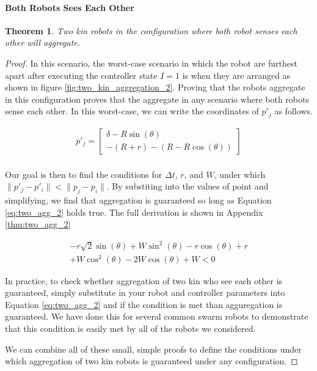 \documentclass[conference]{IEEEtran}
\newtheorem{theorem}{Theorem}
\begin{document}
    \paragraph{Both Robots Sees Each Other}
    \begin{theorem}
      Two kin robots in the configuration where both robot senses each other will aggregate.
    \end{theorem}
    \begin{proof}
      In this scenario, the worst-case scenario in which the robot are furthest apart after executing the controller state $I=1$ is when they are arranged as shown in figure \ref{fig:two_kin_aggregation_2}. Proving that the robots aggregate in this configuration proves that the aggregate in any scenario where both robots sense each other. In this worst-case, we can write the coordinates of $p'_j$ as follows.

    \begin{equation} \label{eq:two_kin_vars_1}
      \begin{split}
        p'_j = \begin{bmatrix}\delta - R\sin(\theta) \\ -(R+r) - (R-R\cos(\theta))\end{bmatrix} \\
      \end{split}
    \end{equation}

      Our goal is then to find the conditions for $\Delta t$, $r$, and $W$, under which $\lVert p'_j - p'_i \rVert < \lVert p_j - p_i \rVert$. By substiting into the values of point and simplifying, we find that aggregation is guaranteed so long as Equation \eqref{eq:two_agg_2} holds true. The full derivation is shown in Appendix \ref{thm:two_agg_2}

      \begin{equation} \label{eq:two_agg_2}
        \begin{split}
        -r\sqrt{2}\sin(\theta) + W\sin^2(\theta) - r\cos(\theta) + r \\
          + W\cos^2(\theta) - 2W\cos(\theta) + W < 0
        \end{split}
      \end{equation}

      In practice, to check whether aggregation of two kin who see each other is guaranteed, simply substitute in your robot and controller parameters into Equation \eqref{eq:two_agg_2} and if the condition is met than agguregation is guaranteed. We have done this for several common swarm robots to demonstrate that this condition is easily met by all of the robots we considered. %

      We can combine all of these small, simple proofs to define the conditions under which aggregation of two kin robots is guaranteed under any configuration.

    \end{proof}
\end{document}
